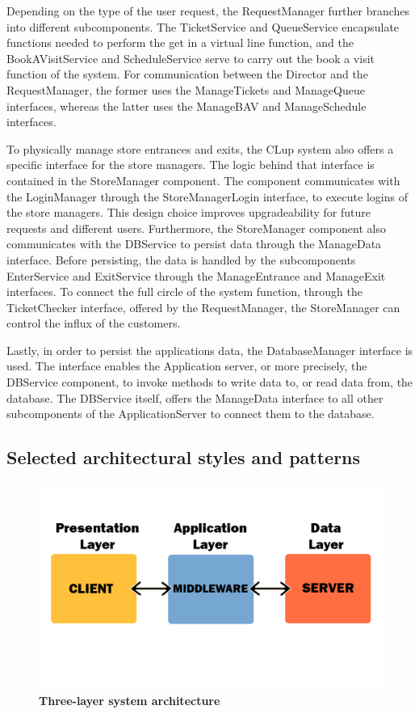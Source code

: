 Depending on the type of the user request, the RequestManager further branches into different subcomponents. The TicketService and QueueService encapsulate functions needed to perform the get in a virtual line function, and the BookAVisitService and ScheduleService serve to carry out the book a visit function of the system. For communication between the Director and the RequestManager, the former uses the ManageTickets and ManageQueue interfaces, whereas the latter uses the ManageBAV and ManageSchedule interfaces. \newline

To physically manage store entrances and exits, the CLup system also offers a specific interface for the store managers. The logic behind that interface is contained in the StoreManager component. The component communicates with the LoginManager through the StoreManagerLogin interface, to execute logins of the store managers. This design choice improves upgradeability for future requests and different users. Furthermore, the StoreManager component also communicates with the DBService to persist data through the ManageData interface. Before persisting, the data is handled by the subcomponents EnterService and ExitService through the ManageEntrance and ManageExit interfaces. To connect the full circle of the system function, through the TicketChecker interface, offered by the RequestManager, the StoreManager can control the influx of the customers. \newline


Lastly, in order to persist the applications data, the DatabaseManager interface is used. The interface enables the Application server, or more precisely, the DBService component, to invoke methods to write data to, or read data from, the database. The DBService itself, offers the ManageData interface to all other subcomponents of the ApplicationServer to connect them to the database. 


\newpage
\subsection{Selected architectural styles and patterns}

\begin{figure}[!h]
\centering
\includegraphics[width=\textwidth]{Images/ThreeLayers}
\caption{\label{fig:arch}\textbf{Three-layer system architecture}}
\end{figure}

